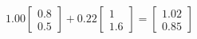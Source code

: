 \documentclass[preview]{standalone}
\begin{document}
\begin{align*}
1.00 \begin{bmatrix} 0.8 \\ 0.5 \end{bmatrix} + 0.22 \begin{bmatrix} 1 \\ 1.6 \end{bmatrix} = \begin{bmatrix} 1.02 \\ 0.85 \end{bmatrix}
\end{align*}
\end{document}
